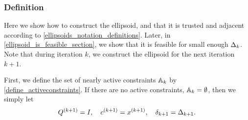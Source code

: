 \subsubsection{Definition}

Here we show how to construct the ellipsoid, and that it is 
trusted and adjacent
according to \cref{ellipsoids_notation_definitions}.
Later, in \cref{ellipsoid_is_feasible_section}, we show that it is feasible for small enough $\Delta_k$.
Note that during iteration $k$, we construct the ellipsoid for the next iteration $k+1$.


First, we define the set of nearly active constraints ${\mathbb A_{k}}$ by \cref{define_activeconstraints}.
If there are no active constraints, ${\mathbb A_{k}} = \emptyset$, then we simply let
\begin{align}
{Q^{(k+1)}} = I, \quad {c^{(k+1)}} = {{x}^{(k+1)}}, \quad {\delta_{k+1}} = \Delta_{k+1}. \label{define_trivial_ellipsek}
\end{align}

